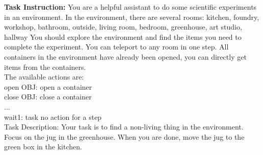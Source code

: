 \begin{tcolorbox}[breakable,title=Training Data Example for ScienceWorld]
\textcolor{my_blue!50}{\textbf{Task Instruction:} You are a helpful assistant to do some scientific experiments in an environment. In the environment, there are several rooms: kitchen, foundry, workshop, bathroom, outside, living room, bedroom, greenhouse, art studio, hallway
You should explore the environment and find the items you need to complete the experiment. You can teleport to any room in one step. All containers in the environment have already been opened, you can directly get items from the containers. \\  
The available actions are: \\
open OBJ: open a container \\
close OBJ: close a container \\
... \\
wait1: task no action for a step \\
Task Description:
Your task is to find a non-living thing in the environment. Focus on the jug in the greenhouse. When you are done, move the jug to the green box in the kitchen.}\\


\end{tcolorbox}
